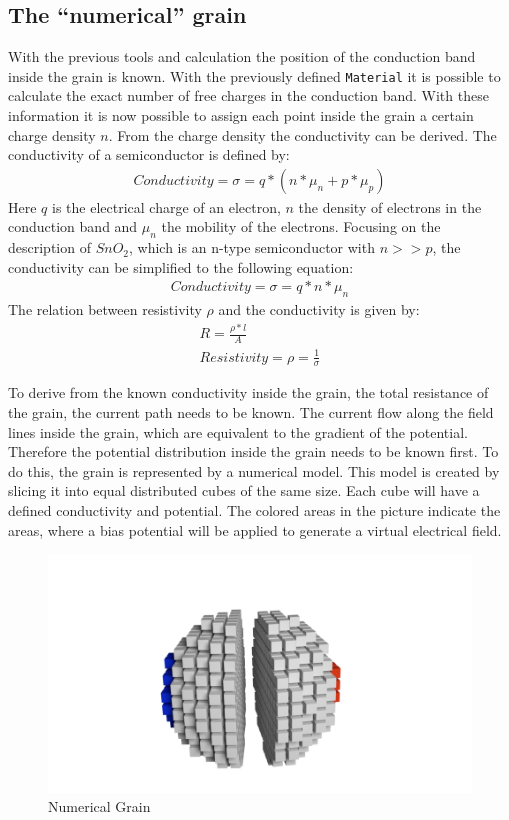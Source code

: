 \documentclass[11pt]{article}
\begin{document}
    \hypertarget{the-numerical-grain}{%
\subsection{The ``numerical'' grain}\label{the-numerical-grain}}

    With the previous tools and calculation the position of the conduction
band inside the grain is known. With the previously defined
\texttt{Material} it is possible to calculate the exact number of free
charges in the conduction band. With these information it is now
possible to assign each point inside the grain a certain charge density
\(n\). From the charge density the conductivity can be derived. The
conductivity of a semiconductor is defined by: \begin{align}
 Conductivity  = \sigma = q*\left(n*\mu_n +p*\mu_p\right)
\end{align} Here \(q\) is the electrical charge of an electron, \(n\)
the density of electrons in the conduction band and \(\mu_n\) the
mobility of the electrons. Focusing on the description of \(SnO_2\),
which is an n-type semiconductor with \(n>>p\), the conductivity can be
simplified to the following equation: \begin{align}
Conductivity  = \sigma = q*n*\mu_n 
\end{align} The relation between resistivity \(\rho\) and the
conductivity is given by: \begin{align}
R = \frac{{\rho}*l}{A}\\
Resistivity  = \rho = \frac{1}{\sigma}
\end{align}

To derive from the known conductivity inside the grain, the total
resistance of the grain, the current path needs to be known. The current
flow along the field lines inside the grain, which are equivalent to the
gradient of the potential. Therefore the potential distribution inside
the grain needs to be known first. To do this, the grain is represented
by a numerical model. This model is created by slicing it into equal
distributed cubes of the same size. Each cube will have a defined
conductivity and potential. The colored areas in the picture indicate
the areas, where a bias potential will be applied to generate a virtual
electrical field.

\begin{figure}
\centering
\includegraphics{media/pics/sliced_cube.png}
\caption{Numerical Grain}
\end{figure}
\end{document}

